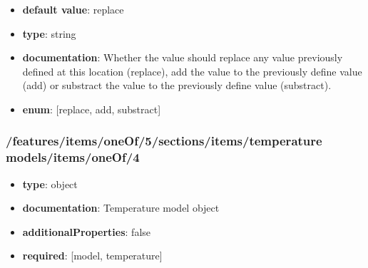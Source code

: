 \begin{itemize}\item {\bf default value}: replace
\item {\bf type}: string
\item {\bf documentation}: Whether the value should replace any value previously defined at this location (replace), add the value to the previously define value (add) or substract the value to the previously define value (substract).
\item {\bf enum}: [replace, add, substract]\end{itemize}\subsubsection{/features/items/oneOf/5/sections/items/temperature models/items/oneOf/4}
\begin{itemize}\item {\bf type}: object
\item {\bf documentation}: Temperature model object
\item {\bf additionalProperties}: false
\item {\bf required}: [model, temperature]\end{itemize}
